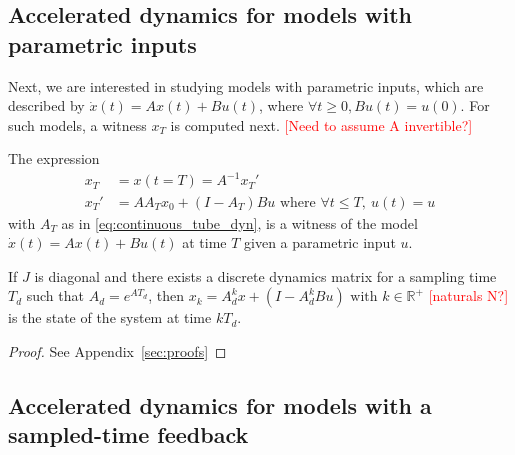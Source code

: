 \documentclass[sigconf]{llncs}
\newcommand{\mat}[1]{{#1}}
\renewcommand{\vec}[1]{{#1}}
\renewcommand{\note}[1]{\textcolor{red}{[#1]}}
\begin{document}
 \subsection{Accelerated dynamics for models with parametric inputs}\label{sec:real_discrete_param_inputs}
 Next, we are interested in studying models with parametric inputs, 
 which are described by $\dot{\vec{x}}(t)=\mat{A}\vec{x}(t)+\mat{B}\vec{u}(t)$, where $\forall t\geq 0, \mat{B}\vec{u}(t)=\vec{u}(0)$. 
 For such models, a witness $\vec{x}_T$ is computed next.  
 \note{Need to assume A invertible?}
\begin{theorem}
The expression
 \begin{align}
 \vec{x}_T&=\vec{x}(t=T)=\mat{A}^{-1}\vec{x}_T'\nonumber\\
\vec{x}_T'&=\mat{A}\mat{A}_T\vec{x}_0 + (\mat{I}-\mat{A}_T)\mat{B}\vec{u} \text{ where } \forall t \leq T,\ \vec{u}(t)=\vec{u} 
 \end{align}
 with $\mat{A}_T$ as in \eqref{eq:continuous_tube_dyn}, 
 is a witness of the model $\dot{\vec{x}}(t)=\mat{A}\vec{x}(t)+\mat{B}\vec{u}(t)$ at time $T$ given a parametric input $\vec{u}$.
 \end{theorem}
 \begin{corollary}
 If $\mat{J}$ is diagonal and there exists a discrete dynamics matrix for a sampling time $T_d$ such that $A_d=e^{\mat{A} T_d}$, then $\vec{x}_k=A_d^k\vec{x}+(\mat{I}-\mat{A}_d^k\mat{B}\vec{u}) \text{ with } k \in \mathbb{R}^+$ \note{naturals N?} is the state of the system at time $kT_d$.
 \end{corollary}
\begin{proof}
See Appendix~\ref{sec:proofs}
\end{proof}

 \subsection{Accelerated dynamics for models with a sampled-time feedback}\label{sec:real_discrete_feedback_inputs}
\end{document}
